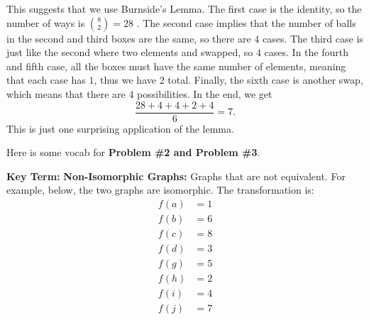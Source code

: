\documentclass[11pt]{scrartcl}
\begin{document}
This suggests that we use Burnside's Lemma. The first case is the identity, so the number of ways is \boldmath $\binom{8}{2}=28$ \unboldmath. The second case implies that the number of balls in the second and third boxes are the same, so there are \boldmath $4$ \unboldmath cases. The third case is just like the second where two elements and swapped, so \boldmath $4$ \unboldmath cases. In the fourth and fifth case, all the boxes must have the same number of elements, meaning that each case has $1$, thus we have \boldmath $2$ \unboldmath total. Finally, the sixth case is another swap, which means that there are \boldmath $4$ \unboldmath possibilities. In the end, we get \[\dfrac{28+4+4+2+4}{6} = \boxed{7}.\] This is just one surprising application of the lemma.

\newpage

Here is some vocab for \textbf{Problem \#2 and Problem \#3}.

\begin{tcolorbox}[colback=vocabcolor!5!white,colframe=vocabcolor!75!black]
  \color{vocabcolor} \textbf{Key Term:} \color{black}
      \textbf{Non-Isomorphic Graphs:} Graphs that are not equivalent. For example, below, the two graphs are isomorphic. The transformation is: 
\begin{align*}
f(a) &= 1 \\
f(b) &= 6 \\
f(c) &= 8 \\
f(d) &= 3 \\
f(g) &= 5 \\
f(h) &= 2 \\
f(i) &= 4 \\
f(j) &= 7 \\
\end{align*}
\end{tcolorbox}

\begin{figure}[h!]
    \centering
\end{figure}
\end{document}
